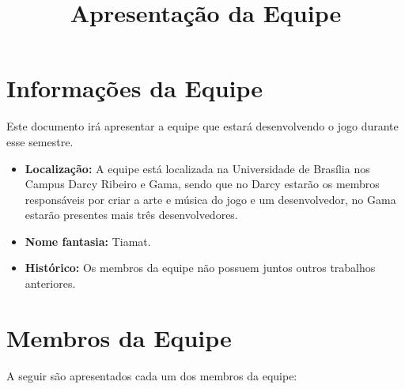 \documentclass[a4paper, 11pt]{article} %
\title{\textbf{Apresentação da Equipe}} %
\makeatletter
\renewcommand{\maketitle}{ %
\begin{center} %
{\LARGE\@title} %

\vspace{20pt} %

\end{center}
}
\makeatother
\begin{document}
\maketitle %


\section*{Informações da Equipe}

Este documento irá apresentar a equipe que estará desenvolvendo o jogo durante esse semestre.

\begin{itemize}
\item \textbf{Localização:} A equipe está localizada na Universidade de Brasília nos Campus Darcy Ribeiro e Gama, sendo que no Darcy estarão os membros responsáveis por criar a arte e música do jogo e um desenvolvedor, no Gama estarão presentes mais três desenvolvedores.

\item \textbf{Nome fantasia:} Tiamat.
\item \textbf{Histórico:} Os membros da equipe não possuem juntos outros trabalhos anteriores.
\end{itemize}

\section*{Membros da Equipe}

A seguir são apresentados cada um dos membros da equipe:
\end{document}
